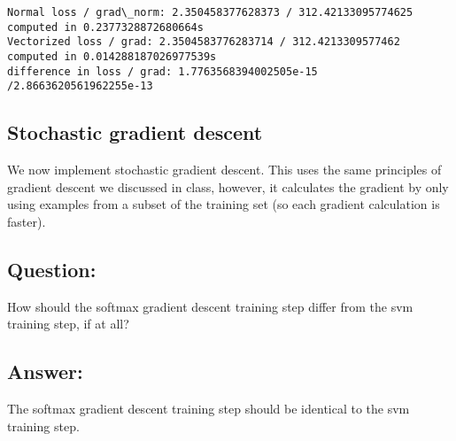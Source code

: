 \documentclass[11pt]{article}
\begin{document}
    \begin{Verbatim}[commandchars=\\\{\}]
Normal loss / grad\_norm: 2.350458377628373 / 312.42133095774625 computed in 0.2377328872680664s
Vectorized loss / grad: 2.3504583776283714 / 312.4213309577462 computed in 0.014288187026977539s
difference in loss / grad: 1.7763568394002505e-15 /2.8663620561962255e-13 

    \end{Verbatim}

    \hypertarget{stochastic-gradient-descent}{%
\subsection{Stochastic gradient
descent}\label{stochastic-gradient-descent}}

We now implement stochastic gradient descent. This uses the same
principles of gradient descent we discussed in class, however, it
calculates the gradient by only using examples from a subset of the
training set (so each gradient calculation is faster).

    \hypertarget{question}{%
\subsection{Question:}\label{question}}

How should the softmax gradient descent training step differ from the
svm training step, if at all?

    \hypertarget{answer}{%
\subsection{Answer:}\label{answer}}

The softmax gradient descent training step should be identical to the
svm training step.
\end{document}
